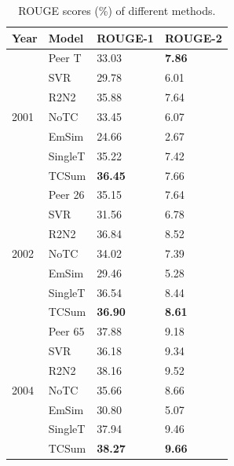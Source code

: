 \documentclass[letterpaper]{article}
\begin{document}
\begin{table}[]
	\centering
	\small
	\begin{tabular}{l|lll}
		\hline
		Year                  & Model   & ROUGE-1 & ROUGE-2 \\ \hline
		\multirow{7}{*}{2001} & Peer T  & 33.03   & \textbf{7.86}    \\
		& SVR     & 29.78   & 6.01    \\
		& R2N2    & 35.88   & 7.64    \\ \cline{2-4} 
		& NoTC    & 33.45   & 6.07    \\
		& EmSim   & 24.66   & 2.67    \\
		& SingleT & 35.22   & 7.42    \\
		& TCSum   & \textbf{36.45}   & 7.66    \\ \hline
		\multirow{7}{*}{2002} & Peer 26 & 35.15   & 7.64    \\
		& SVR     & 31.56   & 6.78    \\
		& R2N2    & 36.84   & 8.52    \\ \cline{2-4} 
		& NoTC    & 34.02   & 7.39    \\
		& EmSim   & 29.46   & 5.28    \\
		& SingleT & 36.54   & 8.44    \\
		& TCSum   & \textbf{36.90}   & \textbf{8.61}    \\ \hline
		\multirow{7}{*}{2004} & Peer 65 & 37.88   & 9.18    \\
		& SVR     & 36.18   & 9.34    \\
		& R2N2    & 38.16   & 9.52    \\ \cline{2-4} 
		& NoTC    & 35.66   & 8.66    \\
		& EmSim   & 30.80   & 5.07    \\
		& SingleT & 37.94   & 9.46    \\
		& TCSum   & \textbf{38.27}   & \textbf{9.66}    \\ \hline
	\end{tabular}
		\caption{ROUGE scores (\%) of different methods.}
		\label{tb:rouge}
\end{table}
\end{document}
